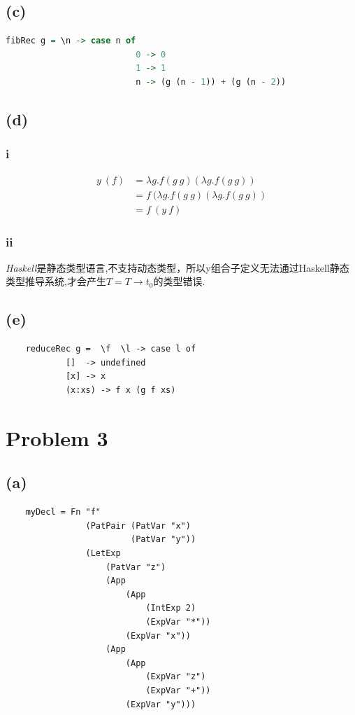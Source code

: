 \documentclass{paper}
\begin{document}
\subsection*{(c)}
	\begin{lstlisting}[language=Haskell]
	fibRec g = \n -> case n of 
						  0 -> 0 
						  1 -> 1 
						  n -> (g (n - 1)) + (g (n - 2)) 
	\end{lstlisting}

\subsection*{(d)}
	\subsubsection*{i}
			\begin{align*} 
				y\ (f) &= \lambda g.f(g\ g)(\lambda g.f(g\ g)) \\
					  &= f\ (\lambda g.f(g\ g)(\lambda g.f(g\ g)) \\
					  &= f\ (y\ f)
   			\end{align*}		
	\subsubsection*{ii} \emph{Haskell}是静态类型语言,不支持动态类型，所以y组合子定义无法通过{Haskell}静态类型推导系统,才会产生$T = T \rightarrow t_0$的类型错误.

\subsection*{(e)} 
	\begin{lstlisting}
	reduceRec g =  \f  \l -> case l of 
			[]  -> undefined 
			[x] -> x 
			(x:xs) -> f x (g f xs)
	\end{lstlisting}

\section*{Problem 3}
\subsection*{(a)} 
	\begin{lstlisting}
	myDecl = Fn "f" 
				(PatPair (PatVar "x") 
						 (PatVar "y"))
				(LetExp 
					(PatVar "z") 
					(App 
						(App 
							(IntExp 2) 
							(ExpVar "*")) 
						(ExpVar "x")) 
					(App 
						(App 
							(ExpVar "z") 
							(ExpVar "+")) 
						(ExpVar "y")))
	\end{lstlisting}
	
\end{document}
